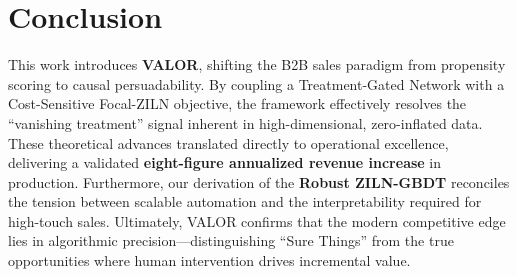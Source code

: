 \documentclass[runningheads]{llncs}
\begin{document}

\section{Conclusion}
This work introduces \textbf{VALOR}, shifting the B2B sales paradigm from propensity scoring to causal persuadability. By coupling a Treatment-Gated Network with a Cost-Sensitive Focal-ZILN objective, the framework effectively resolves the ``vanishing treatment'' signal inherent in high-dimensional, zero-inflated data. These theoretical advances translated directly to operational excellence, delivering a validated \textbf{eight-figure annualized revenue increase} in production. Furthermore, our derivation of the \textbf{Robust ZILN-GBDT} reconciles the tension between scalable automation and the interpretability required for high-touch sales. Ultimately, VALOR confirms that the modern competitive edge lies in algorithmic precision—distinguishing ``Sure Things'' from the true opportunities where human intervention drives incremental value.




\appendix
\end{document}
